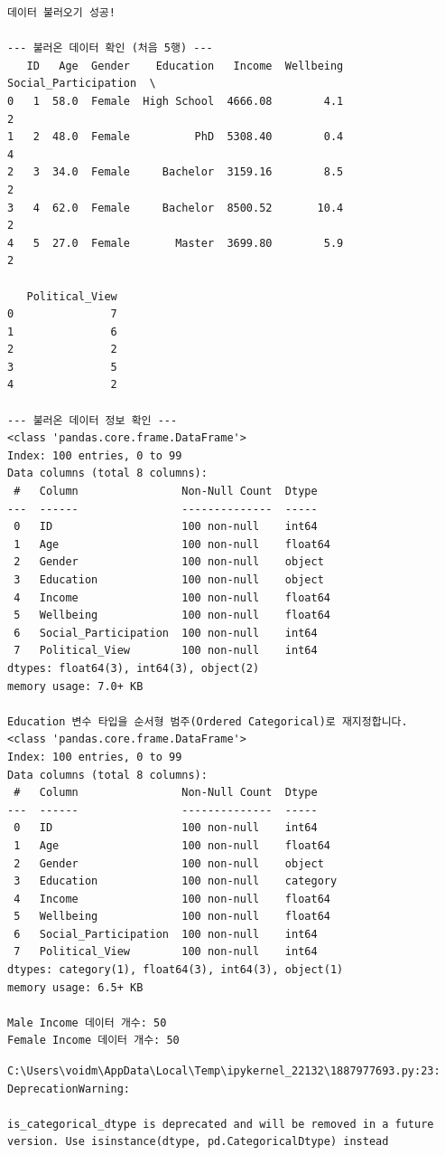 \documentclass[
  letterpaper,
]{book}
\begin{document}
\begin{verbatim}
데이터 불러오기 성공!

--- 불러온 데이터 확인 (처음 5행) ---
   ID   Age  Gender    Education   Income  Wellbeing  Social_Participation  \
0   1  58.0  Female  High School  4666.08        4.1                     2   
1   2  48.0  Female          PhD  5308.40        0.4                     4   
2   3  34.0  Female     Bachelor  3159.16        8.5                     2   
3   4  62.0  Female     Bachelor  8500.52       10.4                     2   
4   5  27.0  Female       Master  3699.80        5.9                     2   

   Political_View  
0               7  
1               6  
2               2  
3               5  
4               2  

--- 불러온 데이터 정보 확인 ---
<class 'pandas.core.frame.DataFrame'>
Index: 100 entries, 0 to 99
Data columns (total 8 columns):
 #   Column                Non-Null Count  Dtype  
---  ------                --------------  -----  
 0   ID                    100 non-null    int64  
 1   Age                   100 non-null    float64
 2   Gender                100 non-null    object 
 3   Education             100 non-null    object 
 4   Income                100 non-null    float64
 5   Wellbeing             100 non-null    float64
 6   Social_Participation  100 non-null    int64  
 7   Political_View        100 non-null    int64  
dtypes: float64(3), int64(3), object(2)
memory usage: 7.0+ KB

Education 변수 타입을 순서형 범주(Ordered Categorical)로 재지정합니다.
<class 'pandas.core.frame.DataFrame'>
Index: 100 entries, 0 to 99
Data columns (total 8 columns):
 #   Column                Non-Null Count  Dtype   
---  ------                --------------  -----   
 0   ID                    100 non-null    int64   
 1   Age                   100 non-null    float64 
 2   Gender                100 non-null    object  
 3   Education             100 non-null    category
 4   Income                100 non-null    float64 
 5   Wellbeing             100 non-null    float64 
 6   Social_Participation  100 non-null    int64   
 7   Political_View        100 non-null    int64   
dtypes: category(1), float64(3), int64(3), object(1)
memory usage: 6.5+ KB

Male Income 데이터 개수: 50
Female Income 데이터 개수: 50
\end{verbatim}

\begin{verbatim}
C:\Users\voidm\AppData\Local\Temp\ipykernel_22132\1887977693.py:23: DeprecationWarning:

is_categorical_dtype is deprecated and will be removed in a future version. Use isinstance(dtype, pd.CategoricalDtype) instead
\end{verbatim}
\end{document}

